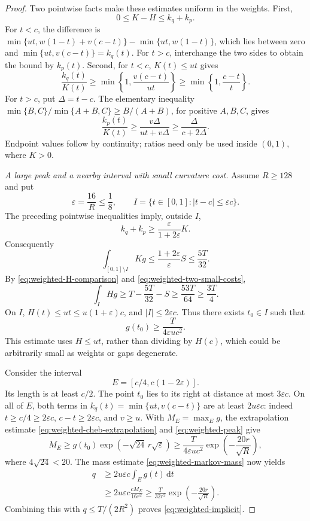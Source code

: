 \begin{proof}
Two pointwise facts make these estimates uniform in the weights. First,
\begin{equation}
 0\le K-H\le k_q+k_p.
 \label{eq:weighted-H-comparison}
\end{equation}
For $t<c$, the difference is
$\min\{ut,w(1-t)+v(c-t)\}-\min\{ut,w(1-t)\}$,
which lies between zero and $\min\{ut,v(c-t)\}=k_q(t)$.
For $t>c$, interchange the two sides to obtain the bound by $k_p(t)$.
Second, for $t<c$, $K(t)\le ut$ gives
\[
 \frac{k_q(t)}{K(t)}
 \ge\min\left\{1,\frac{v(c-t)}{ut}\right\}
 \ge\min\left\{1,\frac{c-t}{t}\right\}.
\]
For $t>c$, put $\Delta=t-c$. The elementary inequality
$\min\{B,C\}/\min\{A+B,C\}\ge B/(A+B)$, for positive
$A,B,C$, gives
\[
 \frac{k_p(t)}{K(t)}
 \ge\frac{v\Delta}{ut+v\Delta}
 \ge\frac{\Delta}{c+2\Delta}.
\]
Endpoint values follow by continuity; ratios need only be used inside
$(0,1)$, where $K>0$.

\emph{A large peak and a nearby interval with small curvature cost.}
Assume $R\ge128$ and put
\[
 \varepsilon=\frac{16}{R}\le\frac18,
 \qquad I=\{t\in[0,1]:|t-c|\le\varepsilon c\}.
\]
The preceding pointwise inequalities imply, outside $I$,
\[
 k_q+k_p\ge\frac{\varepsilon}{1+2\varepsilon}K.
\]
Consequently
\[
 \int_{[0,1]\setminus I}Kg
 \le\frac{1+2\varepsilon}{\varepsilon}S
 \le\frac{5T}{32}.
\]
By \eqref{eq:weighted-H-comparison} and
\eqref{eq:weighted-two-small-costs},
\[
 \int_I Hg\ge T-\frac{5T}{32}-S
 \ge\frac{53T}{64}\ge\frac{3T}{4}.
\]
On $I$, $H(t)\le ut\le u(1+\varepsilon)c$, and $|I|\le2\varepsilon c$.
Thus there exists $t_0\in I$ such that
\begin{equation}
 g(t_0)\ge\frac{T}{4\varepsilon u c^2}.
 \label{eq:weighted-peak}
\end{equation}
This estimate uses $H\le ut$, rather than dividing by $H(c)$, which could
be arbitrarily small as weights or gaps degenerate.

Consider the interval
\[
 E=[c/4,c(1-2\varepsilon)].
\]
Its length is at least $c/2$. The point $t_0$ lies to its right at distance
at most $3\varepsilon c$. On all of $E$, both terms in
$k_q(t)=\min\{ut,v(c-t)\}$ are at least $2u\varepsilon c$:
indeed $t\ge c/4\ge2\varepsilon c$, $c-t\ge2\varepsilon c$, and
$v\ge u$. With $M_E=\max_Eg$, the extrapolation estimate
\eqref{eq:weighted-cheb-extrapolation} and \eqref{eq:weighted-peak} give
\[
 M_E\ge g(t_0)\exp(-\sqrt{24}\,r\sqrt\varepsilon)
 \ge\frac{T}{4\varepsilon u c^2}
       \exp\left(-\frac{20r}{\sqrt R}\right),
\]
where $4\sqrt{24}<20$. The mass estimate
\eqref{eq:weighted-markov-mass} now yields
\begin{align*}
 q&\ge2u\varepsilon c\int_Eg(t)\,\mathrm dt\\
  &\ge2u\varepsilon c\frac{cM_E}{16r^2}
   \ge\frac{T}{32r^2}
       \exp\left(-\frac{20r}{\sqrt R}\right).
\end{align*}
Combining this with $q\le T/(2R^2)$ proves
\eqref{eq:weighted-implicit}.


\end{proof}
